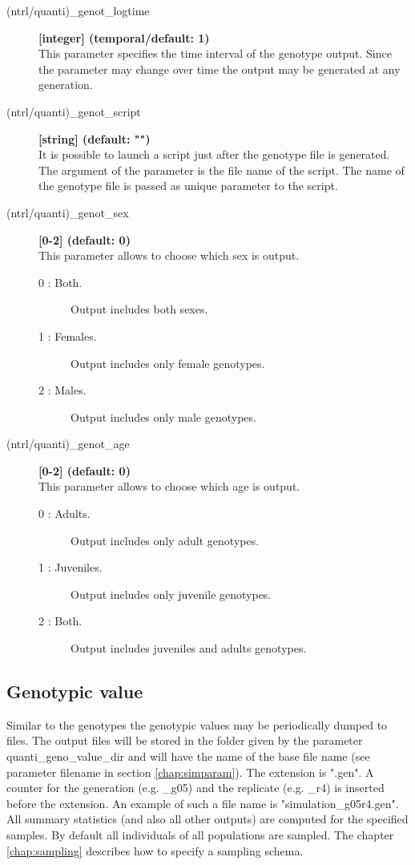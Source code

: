\documentclass[letterpaper,12pt,oneside]{book}
\begin{document}
\begin{description}
\item[(ntrl/quanti)\_genot\_logtime] \textbf{[integer] (temporal/default: 1)}\\
This parameter specifies the time interval of the genotype output. Since the parameter may change over time the output may be generated at any generation.

\item[(ntrl/quanti)\_genot\_script] \textbf{[string] (default: "")}\\
It is possible to launch a script just after the genotype file is generated. The argument of the parameter is the file name of the script. The name of the genotype file is passed as unique parameter to the script. 

\item[(ntrl/quanti)\_genot\_sex] \textbf{[0-2] (default: 0)}\\
This parameter allows to choose which sex is output. 
\begin{description}
\item [0 : Both.] Output includes both sexes.
\item [1 : Females.] Output includes only female genotypes.
\item [2 : Males.] Output includes only male genotypes.
\end{description}

\item[(ntrl/quanti)\_genot\_age] \textbf{[0-2] (default: 0)}\\
This parameter allows to choose which age is output.  
\begin{description}
\item [0 : Adults.] Output includes only adult genotypes.
\item [1 : Juveniles.] Output includes only juvenile genotypes.
\item [2 : Both.] Output includes juveniles and adults genotypes.
\end{description}
\end{description}



\subsection{Genotypic value}\label{genoValQuanti}
Similar to the genotypes the genotypic values may be periodically dumped to files. The output files will be stored in the folder given by the parameter \textsf{quanti\_geno\_value\_dir} and will have the name of the base file name (see parameter \textsf{filename} in section \ref{chap:simparam}). The extension is ".gen". A counter for the generation (e.g. \_g05) and the replicate (e.g. \_r4) is inserted before the extension. An example of such a file name is \textsf{"simulation\_g05r4.gen"}. All summary statistics (and also all other outputs) are computed for the specified samples. By default all individuals of all populations are sampled. The chapter \ref{chap:sampling} describes how to specify a sampling schema.
\end{document}
